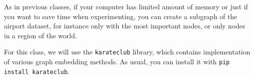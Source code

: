 \documentclass[addpoints]{exam}
\newcommand{\code}[1]{\colorbox{light-gray}{\texttt{#1}}}
\begin{document}
\begin{center}
\end{center}



\begin{tcolorbox}[colback=black!5!white,colframe=white!75!black]
As in previous classes, if your computer has limited amount of memory or just if you want to save time when experimenting, you can create a subgraph of the airport dataset, for instance only with the most important nodes, or only nodes in a region of the world.
\end{tcolorbox}

\begin{tcolorbox}[colback=black!5!white,colframe=white!75!black]
For this class, we will use the \code{karateclub} library, which contains implementation of various graph embedding methods. As usual, you can install it with \code{pip install karateclub}.
\end{tcolorbox}
\end{document}
